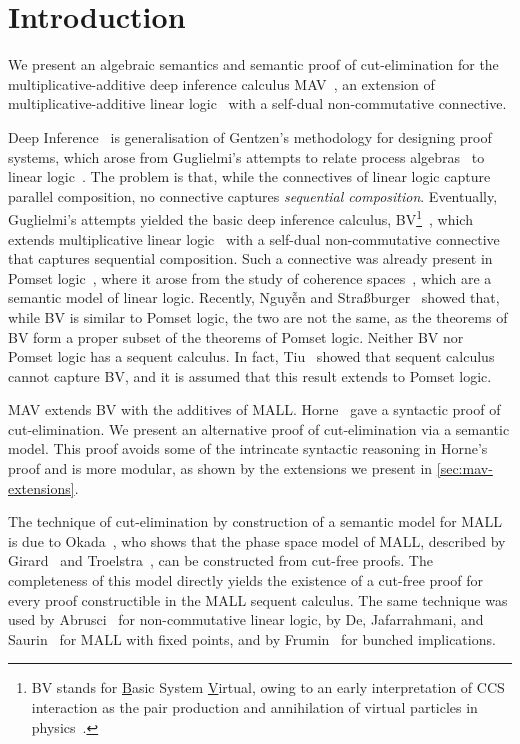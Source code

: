 \section{Introduction}\label{sec:introduction}

We present an algebraic semantics and semantic proof of cut-elimination for the multiplicative-additive deep inference calculus MAV~\cite{Horne15:mav}, an extension of multiplicative-additive linear logic~\cite[MALL]{Girard87:ll} with a self-dual non-commutative connective.

Deep Inference~\cite{Guglielmi14:di} is generalisation of Gentzen's methodology for designing proof systems, which arose from Guglielmi's attempts to relate process algebras~\cite[CCS]{Milner80:CCS,Milner89:CC} to linear logic~\cite{Girard87:ll}.
The problem is that, while the connectives of linear logic capture parallel composition, no connective captures \emph{sequential composition}.
Eventually, Guglielmi's attempts yielded the basic deep inference calculus, BV\footnote{
      BV stands for \underline{B}asic System \underline{V}irtual, owing to an early interpretation of CCS interaction as the pair production and annihilation of virtual particles in physics~\cite[]{Horne15:mav}.
}~\cite{Guglielmi99:bv,Guglielmi07:sis}, which extends multiplicative linear logic~\cite[MLL]{Girard87:ll} with a self-dual non-commutative connective that captures sequential composition.
Such a connective was already present in Pomset logic~\cite{Retore97:pomset}, where it arose from the study of coherence spaces~\cite[]{GirardTL89:proofs}, which are a semantic model of linear logic.
Recently, Nguyễn and Stra{\ss}burger~\cite{NguyenS22:bvisnotpl} showed that, while BV is similar to Pomset logic, the two are not the same, as the theorems of BV form a proper subset of the theorems of Pomset logic.
Neither BV nor Pomset logic has a sequent calculus. In fact, Tiu~\cite{Tiu06:sisii} showed that sequent calculus cannot capture BV, and it is assumed that this result extends to Pomset logic.

MAV extends BV with the additives of MALL. Horne~\cite{Horne15:mav} gave a syntactic proof of cut-elimination. We present an alternative proof of cut-elimination via a semantic model. This proof avoids some of the intrincate syntactic reasoning in Horne's proof and is more modular, as shown by the extensions we present in \cref{sec:mav-extensions}.

The technique of cut-elimination by construction of a semantic model for MALL is due to Okada~\cite{Okada99:psc}, who shows that the phase space model of MALL, described by Girard~\cite[\S4.1]{Girard87:ll} and Troelstra~\cite[]{Troelstra92:lll}, can be constructed from cut-free proofs.
The completeness of this model directly yields the existence of a cut-free proof for every proof constructible in the MALL sequent calculus.
The same technique was used by Abrusci~\cite{Abrusci91:psc} for non-commutative linear logic, by De, Jafarrahmani, and Saurin~\cite{De22:psc} for MALL with fixed points, and by Frumin~\cite{Frumin22:psc} for bunched implications.

